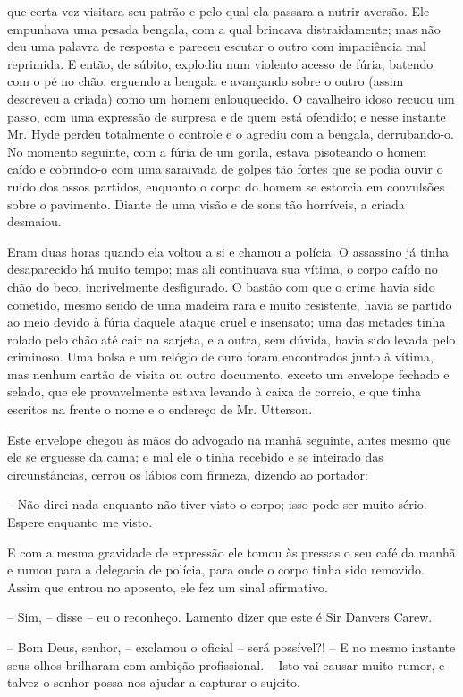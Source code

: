 que certa vez visitara seu patrão e pelo qual ela passara a nutrir
aversão.  Ele empunhava uma pesada bengala, com a qual brincava
distraidamente; mas não deu uma palavra de resposta e pareceu escutar o
outro com impaciência mal reprimida.  E então, de súbito, explodiu num
violento acesso de fúria, batendo com o pé no chão, erguendo a bengala
e avançando sobre o outro (assim descreveu a criada) como um homem
enlouquecido.  O cavalheiro idoso recuou um passo, com uma expressão de
surpresa e de quem está ofendido; e nesse instante Mr. Hyde perdeu
totalmente o controle e o agrediu com a bengala, derrubando-o.  No
momento seguinte, com a fúria de um gorila, estava pisoteando o homem
caído e cobrindo-o com uma saraivada de golpes tão fortes que se podia
ouvir o ruído dos ossos partidos, enquanto o corpo do homem se estorcia em
convulsões sobre o pavimento.  Diante de uma visão e de sons tão
horríveis, a criada desmaiou.

Eram duas horas quando ela voltou a si e chamou a polícia.  O assassino
já tinha desaparecido há muito tempo; mas ali continuava sua vítima, o
corpo caído no chão do beco, incrivelmente desfigurado.  O bastão com
que o crime havia sido cometido, mesmo sendo de uma madeira rara e
muito resistente, havia se partido ao meio devido à fúria daquele
ataque cruel e insensato; uma das metades tinha rolado pelo chão até
cair na sarjeta, e a outra, sem dúvida, havia sido levada pelo
criminoso.  Uma bolsa e um relógio de ouro foram encontrados junto à
vítima, mas nenhum cartão de visita ou outro documento, exceto um
envelope fechado e selado, que ele provavelmente estava levando à caixa
de correio, e que tinha escritos na frente o nome e o endereço de Mr.
Utterson.

Este envelope chegou às mãos do advogado na manhã seguinte, antes mesmo
que ele se erguesse da cama; e mal ele o tinha recebido e se inteirado
das circunstâncias, cerrou os lábios com firmeza, dizendo ao portador:

-- Não direi nada enquanto não tiver visto o corpo; isso pode ser muito
sério.  Espere enquanto me visto.

E com a mesma gravidade de expressão ele tomou às pressas o seu café da
manhã e rumou para a delegacia de polícia, para onde o corpo tinha sido		
removido.  Assim que entrou no aposento, ele fez um sinal afirmativo.

-- Sim, -- disse -- eu o reconheço.  Lamento dizer que este é Sir
Danvers Carew. 

-- Bom Deus, senhor, -- exclamou o oficial -- será possível?!  -- E no
mesmo instante seus olhos brilharam com ambição profissional. -- Isto
vai causar muito rumor, e talvez o senhor possa nos ajudar a capturar o
sujeito.

